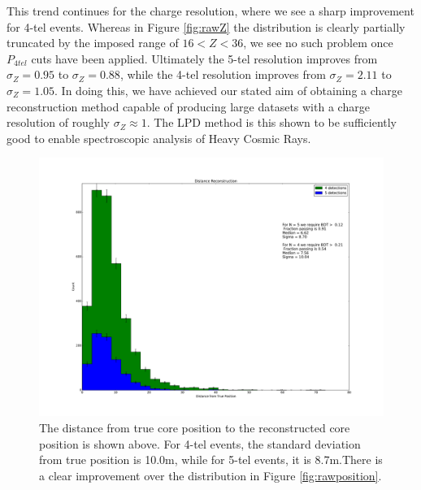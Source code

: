 \documentclass[11pt]{article}
\begin{document}
This trend continues for the charge resolution, where we see a sharp improvement for 4-tel events. Whereas in Figure \ref{fig:rawZ} the distribution is clearly partially truncated by the imposed range of $16 < Z < 36$, we see no such problem once $P_{4tel}$ cuts have been applied. Ultimately the 5-tel resolution improves from $\sigma_{Z}=0.95$ to $\sigma_{Z}=0.88$, while the 4-tel resolution improves from $\sigma_{Z}=2.11$ to $\sigma_{Z}=1.05$. In doing this, we have achieved our stated aim of obtaining a charge reconstruction method capable of producing large datasets with a charge resolution of roughly  $\sigma_{Z} \approx 1$. The LPD method is this shown to be sufficiently good to enable spectroscopic analysis of Heavy Cosmic Rays. 

\begin{figure}
\begin{center}
\includegraphics[width=\textwidth]{position}
\caption{The distance from true core position to the reconstructed core position is shown above. For 4-tel events, the standard deviation from true position is 10.0m, while for 5-tel events, it is 8.7m.There is a clear improvement over the distribution in Figure \ref{fig:rawposition}.}
\label{fig:position}
\end{center}
\end{figure}
\end{document}
